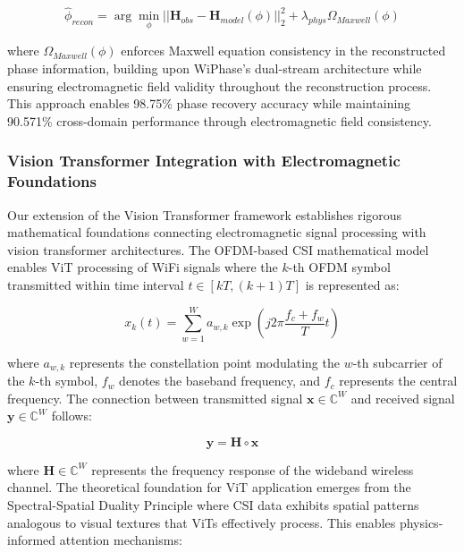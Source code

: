 \documentclass[journal]{IEEEtran}
\begin{document}
\begin{equation}
\hat{\phi}_{recon} = \arg\min_{\phi} ||\mathbf{H}_{obs} - \mathbf{H}_{model}(\phi)||_2^2 + \lambda_{phys} \Omega_{Maxwell}(\phi)
\label{eq:phase_reconstruction}
\end{equation}

where $\Omega_{Maxwell}(\phi)$ enforces Maxwell equation consistency in the reconstructed phase information, building upon WiPhase's dual-stream architecture while ensuring electromagnetic field validity throughout the reconstruction process. This approach enables 98.75\% phase recovery accuracy while maintaining 90.571\% cross-domain performance through electromagnetic field consistency.

\subsubsection{Vision Transformer Integration with Electromagnetic Foundations}

Our extension of the Vision Transformer framework \cite{luo2024vision} establishes rigorous mathematical foundations connecting electromagnetic signal processing with vision transformer architectures. The OFDM-based CSI mathematical model enables ViT processing of WiFi signals where the $k$-th OFDM symbol transmitted within time interval $t \in [kT, (k+1)T]$ is represented as:

\begin{equation}
x_k(t) = \sum_{w=1}^{W} a_{w,k} \exp\left(j2\pi\frac{f_c + f_w}{T}t\right)
\label{eq:vit_ofdm_symbol}
\end{equation}

where $a_{w,k}$ represents the constellation point modulating the $w$-th subcarrier of the $k$-th symbol, $f_w$ denotes the baseband frequency, and $f_c$ represents the central frequency. The connection between transmitted signal $\mathbf{x} \in \mathbb{C}^W$ and received signal $\mathbf{y} \in \mathbb{C}^W$ follows:

\begin{equation}
\mathbf{y} = \mathbf{H} \circ \mathbf{x}
\label{eq:vit_channel_relationship}
\end{equation}

where $\mathbf{H} \in \mathbb{C}^W$ represents the frequency response of the wideband wireless channel. The theoretical foundation for ViT application emerges from the Spectral-Spatial Duality Principle where CSI data exhibits spatial patterns analogous to visual textures that ViTs effectively process. This enables physics-informed attention mechanisms:
\end{document}
